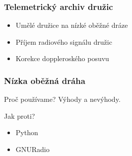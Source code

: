 \documentclass[%
  12pt,               %
  t,                  %
  aspectratio=1610,   %
  unicode,            %
czech,              %
]{beamer}              %
\begin{document}
\vypninavigacnisymboly

\vytvortitulku

\begin{frame} 
  \frametitle{Telemetrický archiv družic}
  \begin{itemize}
    \item Umělé družice na nízké oběžné dráze
    \item Příjem radiového signálu družic
    \item Korekce doppleroského posuvu
  \end{itemize}
\end{frame}

\begin{frame} 
  \frametitle{Nízka oběžná dráha}



  \begin{block}{Proč používame?}
    Výhody a nevýhody.
  \end{block}

  \begin{alertblock}{Jak proti?}
    \begin{itemize}
      \item Python
      \item GNURadio
    \end{itemize}
  \end{alertblock}
\end{frame} 
\end{document}
